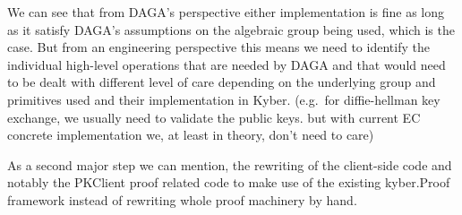     We can see that from DAGA's perspective either implementation is fine as long as it satisfy DAGA's assumptions on the
    algebraic group being used, which is the case. But from an engineering perspective this means we need to identify the individual high-level operations that are needed by DAGA
    and that would need to be dealt with different level of care depending on the underlying group and primitives used and their implementation in Kyber.
    (e.g.\ for diffie-hellman key exchange, we usually need to validate the public keys.
    but with current EC concrete implementation we, at least in theory, don't need to care)\medskip %

    As a second major step we can mention, the rewriting of the client-side code and notably the PKClient proof related code to make use of the existing kyber.Proof framework instead of rewriting whole proof machinery by hand.

